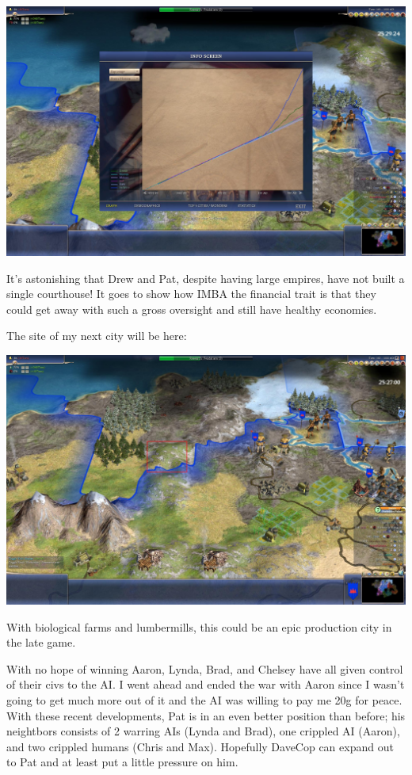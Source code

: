\documentclass[10pt]{article}
\begin{document}
\includegraphics[width=1.0\textwidth]{turn160-3}

It's astonishing that Drew and Pat, despite having large empires, have
not built a single courthouse! It goes to show how IMBA the financial
trait is that they could get away with such a gross oversight and
still have healthy economies.

The site of my next city will be here:

\includegraphics[width=1.0\textwidth]{turn160-4}

With biological farms and lumbermills, this could be an epic production city in the late game.

With no hope of winning Aaron, Lynda, Brad, and Chelsey have all given
control of their civs to the AI. I went ahead and ended the war with
Aaron since I wasn't going to get much more out of it and the AI was
willing to pay me 20g for peace. With these recent developments, Pat
is in an even better position than before; his neightbors consists of
2 warring AIs (Lynda and Brad), one crippled AI (Aaron), and two
crippled humans (Chris and Max). Hopefully DaveCop can expand out to
Pat and at least put a little pressure on him.
\end{document}
